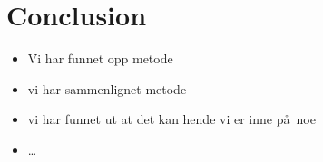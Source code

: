 \chapter{Conclusion}
\label{chapter:conclusion}

\begin{itemize}
  \item Vi har funnet opp metode
  \item vi har sammenlignet metode
  \item vi har funnet ut at det kan hende vi er inne p\aa~noe
  \item \ldots
\end{itemize}